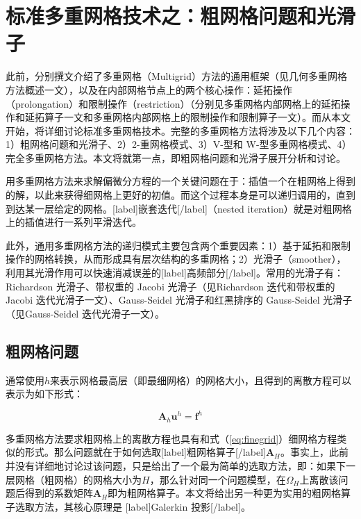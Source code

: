 \documentclass[12pt, UTF8, nofonts]{ctexart}
\begin{document}

\section*{标准多重网格技术之：粗网格问题和光滑子}

此前，分别撰文介绍了多重网格（Multigrid）方法的通用框架（见几何多重网格方法概述一文），以及在内部网格节点上的两个核心操作：延拓操作（prolongation）和限制操作（restriction）（分别见多重网格内部网格上的延拓操作和延拓算子一文和多重网格内部网格上的限制操作和限制算子一文）。而从本文开始，将详细讨论标准多重网格技术。完整的多重网格方法将涉及以下几个内容：1）粗网格问题和光滑子、2）2-重网格模式、3）V-型和 W-型多重网格模式、4）完全多重网格方法。本文将就第一点，即粗网格问题和光滑子展开分析和讨论。

用多重网格方法来求解偏微分方程的一个关键问题在于：插值一个在粗网格上得到的解，以此来获得细网格上更好的初值。而这个过程本身是可以递归调用的，直到到达某一层给定的网格。[label]嵌套迭代[/label]（nested iteration）就是对粗网格上的插值进行一系列平滑迭代。

此外，通用多重网格方法的递归模式主要包含两个重要因素：1）基于延拓和限制操作的网格转换，从而形成具有层次结构的多重网格；2）光滑子（smoother），利用其光滑作用可以快速消减误差的[label]高频部分[/label]。常用的光滑子有：Richardson 光滑子、带权重的 Jacobi 光滑子（见Richardson 迭代和带权重的 Jacobi 迭代光滑子一文）、Gauss-Seidel 光滑子和红黑排序的 Gauss-Seidel 光滑子（见Gauss-Seidel 迭代光滑子一文）。

\subsection*{粗网格问题}

通常使用$h$来表示网格最高层（即最细网格）的网格大小，且得到的离散方程可以表示为如下形式：

\begin{equation}
  \label{eq:finegrid}
  \boldsymbol{A}_h\boldsymbol{u}^h = \boldsymbol{f}^h
\end{equation}

多重网格方法要求粗网格上的离散方程也具有和式（\ref{eq:finegrid}）细网格方程类似的形式。那么问题就在于如何选取[label]粗网格算子[/label]$\boldsymbol{A}_H$。事实上，此前并没有详细地讨论过该问题，只是给出了一个最为简单的选取方法，即：如果下一层网格（粗网格）的网格大小为$H$，那么针对同一个问题模型，在$\Omega_H$上离散该问题后得到的系数矩阵$\boldsymbol{A}_H$即为粗网格算子。本文将给出另一种更为实用的粗网格算子选取方法，其核心原理是 [label]Galerkin 投影[/label]。
\end{document}
